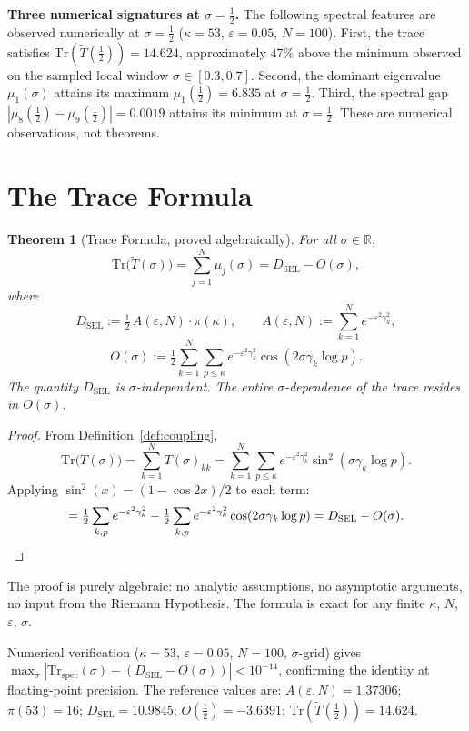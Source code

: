 \documentclass[11pt]{article}
\newtheorem{theorem}{Theorem}[section]
\newcommand{\Tt}{\widetilde{T}}
\newcommand{\DSEL}{D_{\mathrm{SEL}}}
\begin{document}
\textbf{Three numerical signatures at $\sigma=\tfrac{1}{2}$.}
The following spectral features are observed numerically at
$\sigma=\tfrac{1}{2}$ ($\kappa=53$, $\varepsilon=0.05$, $N=100$).
First, the trace satisfies $\mathrm{Tr}(\Tt(\tfrac{1}{2}))=14.624$,
approximately $47\%$ above the minimum observed on the
sampled local window $\sigma\in[0.3,0.7]$.
Second, the dominant eigenvalue $\mu_1(\sigma)$ attains its maximum
$\mu_1(\tfrac{1}{2})=6.835$ at $\sigma=\tfrac{1}{2}$.
Third, the spectral gap $|\mu_8(\tfrac{1}{2})-\mu_9(\tfrac{1}{2})|=0.0019$
attains its minimum at $\sigma=\tfrac{1}{2}$.
These are numerical observations, not theorems.

\section{The Trace Formula}
\label{sec:trace}

\begin{theorem}[Trace Formula, proved algebraically]
\label{thm:trace}
For all $\sigma\in\mathbb{R}$,
\[
\mathrm{Tr}\bigl(\Tt(\sigma)\bigr)
  = \sum_{j=1}^N \mu_j(\sigma)
  = \DSEL - O(\sigma),
\]
where
\[
\DSEL   := \tfrac{1}{2}\,A(\varepsilon,N)\cdot\pi(\kappa),\qquad
A(\varepsilon,N) := \sum_{k=1}^N e^{-\varepsilon^2\gamma_k^2},
\]
\[
O(\sigma) := \tfrac{1}{2}\sum_{k=1}^N\sum_{p\leq\kappa}
             e^{-\varepsilon^2\gamma_k^2}\cos(2\sigma\gamma_k\log p).
\]
The quantity $\DSEL$ is $\sigma$-independent.
The entire $\sigma$-dependence of the trace resides in $O(\sigma)$.
\end{theorem}

\begin{proof}
From Definition~\ref{def:coupling},
\[
\mathrm{Tr}\bigl(\Tt(\sigma)\bigr)
  = \sum_{k=1}^N \Tt(\sigma)_{kk}
  = \sum_{k=1}^N\sum_{p\leq\kappa}
    e^{-\varepsilon^2\gamma_k^2}\sin^2(\sigma\gamma_k\log p).
\]
Applying $\sin^2(x)=(1-\cos 2x)/2$ to each term:
\[
= \tfrac{1}{2}\sum_{k,p} e^{-\varepsilon^2\gamma_k^2}
  - \tfrac{1}{2}\sum_{k,p} e^{-\varepsilon^2\gamma_k^2}\cos(2\sigma\gamma_k\log p)
  = \DSEL - O(\sigma). \qedhere
\]
\end{proof}

The proof is purely algebraic: no analytic assumptions, no asymptotic
arguments, no input from the Riemann Hypothesis.
The formula is exact for any finite $\kappa$, $N$, $\varepsilon$, $\sigma$.

Numerical verification ($\kappa=53$, $\varepsilon=0.05$, $N=100$,
$\sigma$-grid) gives
$\max_\sigma|\mathrm{Tr}_{\mathrm{spec}}(\sigma)-(\DSEL-O(\sigma))|<10^{-14}$,
confirming the identity at floating-point precision.
The reference values are:
$A(\varepsilon,N)=1.37306$; $\pi(53)=16$;
$\DSEL = 10.9845$; $O(\tfrac{1}{2})=-3.6391$;
$\mathrm{Tr}(\Tt(\tfrac{1}{2}))=14.624$.
\end{document}
